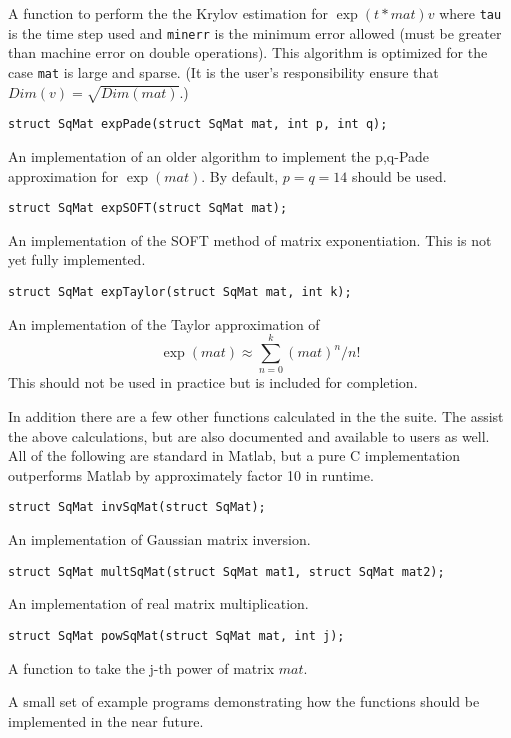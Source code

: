 \documentclass[%
 reprint,
 amsmath,amssymb,
 aps,
]{revtex4-1}
\begin{document}
A function to perform the the Krylov estimation for $\exp(t*mat)v$ where \texttt{tau} is the time step used and \texttt{minerr} is the minimum error allowed (must be greater than machine error on double operations). This algorithm is optimized for the case \texttt{mat} is large and sparse. (It is the user's responsibility ensure that $Dim(v)=\sqrt{Dim(mat)}$.)
\newline

\texttt{struct SqMat expPade(struct SqMat mat, int p, int q);}

An implementation of an older algorithm to implement the p,q-Pade approximation for $\exp(mat)$. By default, $p=q=14$ should be used.
\newline

\texttt{struct SqMat expSOFT(struct SqMat mat);}

An implementation of the SOFT method of matrix exponentiation. This is not yet fully implemented.
\newline

\texttt{struct SqMat expTaylor(struct SqMat mat, int k);}

An implementation of the Taylor approximation of
$$\exp(mat)\approx\sum_{n=0}^k(mat)^n/n!$$
This should not be used in practice but is included for completion.
\newline

In addition there are a few other functions calculated in the the suite. The assist the above calculations, but are also documented and available to users as well. All of the following are standard in Matlab, but a pure C implementation outperforms Matlab by approximately factor 10 in runtime.
\newline

\texttt{struct SqMat invSqMat(struct SqMat);}

An implementation of Gaussian matrix inversion.
\newline

\texttt{struct SqMat multSqMat(struct SqMat mat1, struct SqMat mat2);}

An implementation of real matrix multiplication.
\newline

\texttt{struct SqMat powSqMat(struct SqMat mat, int j);}

A function to take the j-th power of matrix $mat$.
\newline

A small set of example programs demonstrating how the functions should be implemented in the near future.
\end{document}
